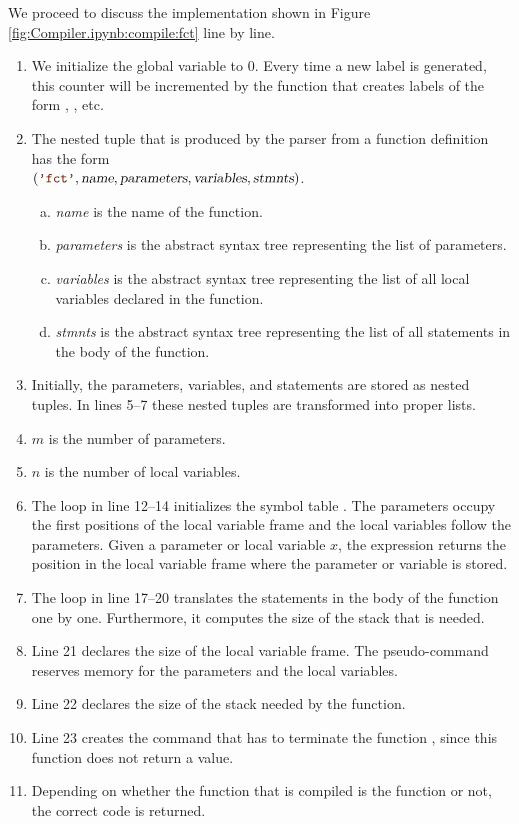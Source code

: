 We proceed to discuss the implementation shown in Figure \ref{fig:Compiler.ipynb:compile:fct} line by line.
\begin{enumerate}
\item We initialize the global variable  to $0$.
      Every time a new label is generated, this counter will be incremented by the function 
      that creates labels of the form , , etc.
\item The nested tuple that is produced by the parser from a function definition has the form
      \\[0.2cm]
      \hspace*{1.3cm}
      $(\mytt{'fct'}, \textsl{name}, \textsl{parameters}, \textsl{variables}, \textsl{stmnts})$.
      \begin{enumerate}[(a)]
      \item \textsl{name} is the name of the function.
      \item \textsl{parameters} is the abstract syntax tree representing the list of parameters.
      \item \textsl{variables} is the abstract syntax tree representing the list of all local variables
            declared in the function. 
      \item \textsl{stmnts} is the abstract syntax tree representing the list of all statements in the body
            of the function. 
      \end{enumerate}
\item Initially, the parameters, variables, and statements are stored as nested tuples.
      In lines 5--7 these nested tuples are transformed into proper lists.
\item $m$ is the number of parameters. 
\item $n$ is the number of local variables. 
\item The  loop in line 12--14 initializes the symbol table .  The parameters occupy the
      first positions of the local variable frame and the local variables follow the parameters.
      Given a parameter or local variable $x$, the expression 
      returns the position in the local variable frame where the parameter or variable is stored.
\item The  loop in line 17--20 translates the statements in the body of the function one by one.
  Furthermore, it computes the size of the stack that is needed.
\item Line 21 declares the size of the local variable frame.  The pseudo-command 
  reserves memory for the parameters and the local variables.
\item Line 22 declares the size of the stack needed by the function.
\item Line 23 creates the command  that has to terminate the function , since this
  function does not return a value.
\item Depending on whether the function that is compiled is the function  or not,
  the correct code is returned.
\end{enumerate}

